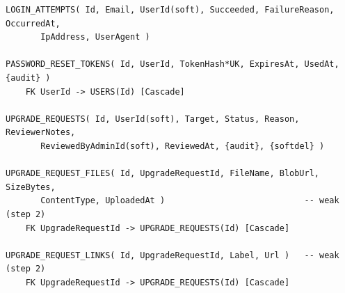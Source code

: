 \documentclass[11pt,a4paper]{article}
\begin{document}
{\begin{verbatim}
LOGIN_ATTEMPTS( Id, Email, UserId(soft), Succeeded, FailureReason, OccurredAt,
       IpAddress, UserAgent )

PASSWORD_RESET_TOKENS( Id, UserId, TokenHash*UK, ExpiresAt, UsedAt, {audit} )
    FK UserId -> USERS(Id) [Cascade]

UPGRADE_REQUESTS( Id, UserId(soft), Target, Status, Reason, ReviewerNotes,
       ReviewedByAdminId(soft), ReviewedAt, {audit}, {softdel} )

UPGRADE_REQUEST_FILES( Id, UpgradeRequestId, FileName, BlobUrl, SizeBytes,
       ContentType, UploadedAt )                            -- weak (step 2)
    FK UpgradeRequestId -> UPGRADE_REQUESTS(Id) [Cascade]

UPGRADE_REQUEST_LINKS( Id, UpgradeRequestId, Label, Url )   -- weak (step 2)
    FK UpgradeRequestId -> UPGRADE_REQUESTS(Id) [Cascade]
\end{verbatim}}
\end{document}
